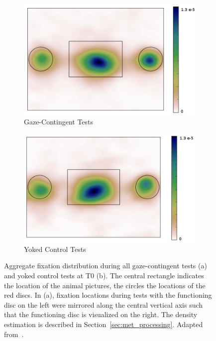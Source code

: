 \documentclass[a4paper]{scrreprt}
\begin{document}
\begin{figure}
\centering
    \begin{subfigure}[b]{0.49\textwidth}
        \includegraphics[width=\textwidth]{figs/sec3/active_nofix_2.png}
        \caption{Gaze-Contingent Tests}
    \end{subfigure}
\begin{subfigure}[b]{0.49\textwidth}
        \includegraphics[width=\textwidth]{figs/sec3/yoked_nofix_2.png}
        \caption{Yoked Control Tests}
    \end{subfigure}
\caption{Aggregate fixation distribution during all gaze-contingent tests (a) and yoked control tests at T0 (b). The central rectangle indicates the location of the animal pictures, the circles the locations of the red discs. In (a), fixation locations during tests with the functioning disc on the left were mirrored along the central vertical axis such that the functioning disc is visualized on the right. The density estimation is described in Section~\ref{sec:met_processing}. Adapted from~\cite{kolling17}.}
\label{fig:fix_dist}
\end{figure}
\end{document}
